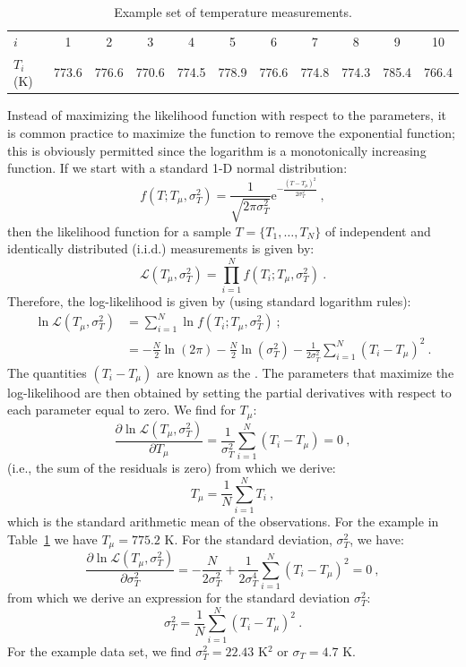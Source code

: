 \begin{table}[ht]
\centering\leavevmode
\begin{tabular}{|l|cccccccccc|}
\hline
$i$ & 1 & 2 & 3 & 4 & 5 & 6 & 7 & 8 & 9 & 10 \\
$T_i$ (K) &773.6   &   776.6 &     770.6 &      774.5 &      778.9 &      776.6 &      774.8 &      774.3 &      785.4 &      766.4\\
\hline
\end{tabular}
\caption{\label{\chabbr:tb:thermal}Example set of temperature measurements.}
\end{table}

Instead of maximizing the likelihood function with respect to the parameters, it is common practice to maximize the  function to remove the exponential function; this is obviously permitted since the logarithm is a monotonically increasing function. If we start with a standard 1-D normal distribution:
\[
	f(T;T_\mu,\sigma_T^2) = \frac{1}{\sqrt{2\pi\sigma_T^2}}\mathrm{e}^{-\frac{(T-T_\mu)^2}{2\sigma_T^2}}\ ,
\]
then the likelihood function for a sample $T=\{T_1,\ldots,T_N\}$ of  independent and identically distributed (i.i.d.) measurements is given by:
\[
	\mathcal{L}(T_\mu,\sigma_T^2) =  \prod_{i=1}^N f(T_i;T_\mu,\sigma_T^2)\ .
\]
Therefore, the log-likelihood is given by (using standard logarithm rules):
\begin{equation*}
\begin{split}
	\ln \mathcal{L}(T_\mu,\sigma_T^2) &= \sum_{i=1}^N \ln  f(T_i;T_\mu,\sigma_T^2)\ ;\\
	&= -\frac{N}{2}\ln(2\pi) - \frac{N}{2}\ln(\sigma_T^2) -\frac{1}{2\sigma_T^2}  \sum_{i=1}^N (T_i-T_{\mu})^2\ .
\end{split}
\end{equation*} 
The quantities $(T_i-T_{\mu})$ are known as the .  The parameters that maximize the log-likelihood are then obtained by setting the partial derivatives with respect to each parameter equal to zero. We find for $T_{\mu}$:
\[
	\frac{\partial \ln \mathcal{L}(T_\mu,\sigma_T^2)}{\partial T_{\mu}} = \frac{1}{\sigma_T^2}  \sum_{i=1}^N (T_i-T_{\mu}) = 0\ ,
\]
(i.e., the sum of the residuals is zero) from which we derive:
\begin{equation}
	T_{\mu} = \frac{1}{N} \sum_{i=1}^N T_i\ ,
\end{equation}
which is the standard arithmetic mean of the observations. For the example in Table~\ref{\chabbr:tb:thermal} we have $T_{\mu} = 775.2$ K.
For the standard deviation, $\sigma_T^2$, we have:
\[
	\frac{\partial \ln \mathcal{L}(T_\mu,\sigma_T^2)}{\partial \sigma_T^2} =  - \frac{N}{2\sigma_T^2} +\frac{1}{2\sigma_T^4}  \sum_{i=1}^N (T_i-T_{\mu})^2 = 0\ ,
\]
from which we derive an expression for the standard deviation $\sigma_T^2$:
\begin{equation}
	\sigma_T^2 = \frac{1}{N} \sum_{i=1}^N (T_i-T_{\mu})^2\ .
\end{equation}
For the example data set, we find $\sigma_T^2=22.43$ K$^2$ or $\sigma_T=4.7$ K.  


